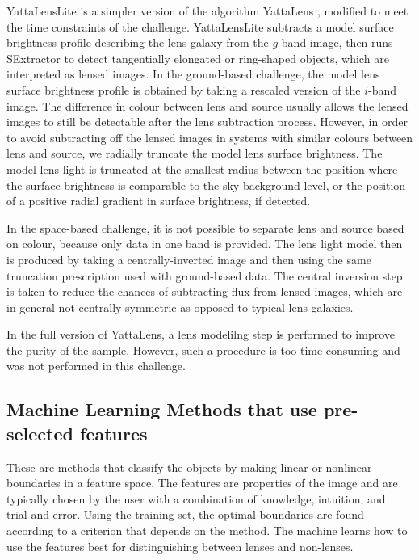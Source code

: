\documentclass{aa}
\begin{document}
YattaLensLite is a simpler version of the algorithm YattaLens \citep{2017arXiv170401585S}, modified to meet the time constraints of the challenge.
YattaLensLite subtracts a model surface brightness profile describing the lens galaxy from the $g$-band image, then runs SExtractor to detect tangentially elongated or ring-shaped objects, which are interpreted as lensed images.
In the ground-based challenge, the model lens surface brightness profile is obtained by taking a rescaled version of the $i$-band image.
The difference in colour between lens and source usually allows the lensed images to still be detectable after the lens subtraction process.
However, in order to avoid subtracting off the lensed images in systems with similar colours between lens and source, we radially truncate the model lens surface brightness.
The model lens light is truncated at the smallest radius between the position where the surface brightness is comparable to the sky background level, or the position of a positive radial gradient in surface brightness, if detected.

In the space-based challenge, it is not possible to separate lens and source based on colour, because only data in one band is provided. The lens light model then is produced by taking a centrally-inverted image and then using the same truncation prescription used with ground-based data. The central inversion step is taken to reduce the chances of subtracting flux from lensed images, which are in general not centrally symmetric as opposed to typical lens galaxies.

In the full version of YattaLens, a lens modelilng step is performed to improve the purity of the sample. However, such a procedure is too time consuming and was not performed in this challenge.

\subsection{Machine Learning Methods that use pre-selected features}

These are methods that classify the objects by making linear or nonlinear boundaries in a feature space.  The features are properties of the image and are typically chosen by the user with a combination of knowledge, intuition, and trial-and-error.  Using the training set, the optimal boundaries are found according to a criterion that depends on the method.  The machine learns how to use the features best for distinguishing between lenses and non-lenses.
\end{document}
